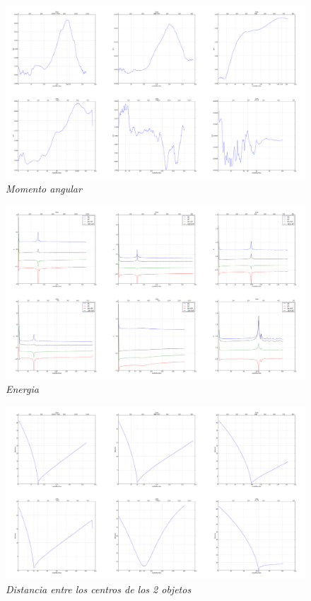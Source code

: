 \documentclass[12pt]{book}
\begin{document}
\begin{figure}[h!]
 \centering
 \includegraphics[scale=0.1]{am.png}
 \caption{\emph{Momento angular}}
 \label{Fig: 5}
\end{figure}

\begin{figure}[h!]
 \centering
 \includegraphics[scale=0.1]{en.png}
 \caption{\emph{Energia}}
 \label{Fig: 5}
\end{figure}

\begin{figure}[h!]
 \centering
 \includegraphics[scale=0.1]{cmdif.png}
 \caption{\emph{Distancia entre los centros de los 2 objetos}}
 \label{Fig: 5}
\end{figure}
\end{document}

